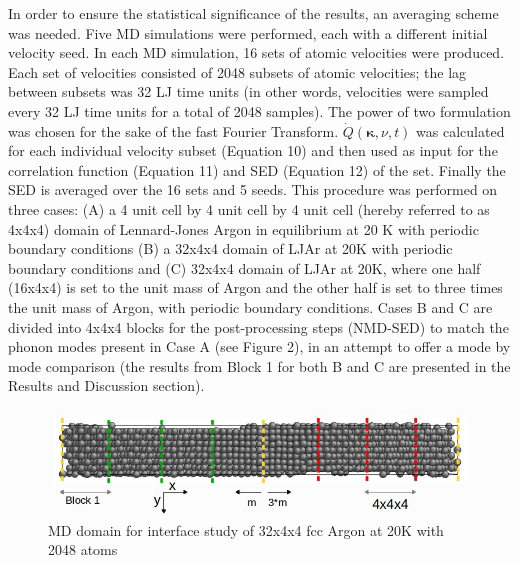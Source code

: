 \documentclass{article}
\begin{document}
In order to ensure the statistical significance of the results, an averaging scheme was needed. Five MD simulations were performed, each with a different initial velocity seed. In each MD simulation, 16 sets of atomic velocities were produced. Each set of velocities consisted of 2048 subsets of atomic velocities; the lag between subsets was 32 LJ time units (in other words, velocities were sampled every 32 LJ time units for a total of 2048 samples). The power of two formulation was chosen for the sake of the fast Fourier Transform. $\dot{Q}(\pmb{\kappa},\nu,t)$ was calculated for each individual velocity subset (Equation 10) and then used as input for the correlation function (Equation 11) and SED (Equation 12) of the set. Finally the SED is averaged over the 16 sets and 5 seeds. This procedure was performed on three cases: (A) a 4 unit cell by 4 unit cell by 4 unit cell (hereby referred to as 4x4x4) domain of Lennard-Jones Argon in equilibrium at 20 K with periodic boundary conditions (B) a 32x4x4 domain of LJAr at 20K with periodic boundary conditions and (C) 32x4x4 domain of LJAr at 20K, where one half (16x4x4) is set to the unit mass of Argon and the other half is set to three times the unit mass of Argon, with periodic boundary conditions. Cases B and C are divided into 4x4x4 blocks for the post-processing steps (NMD-SED) to match the phonon modes present in Case A (see Figure 2), in an attempt to offer a mode by mode comparison (the results from Block 1 for both B and C are presented in the Results and Discussion section). 

\begin{figure}[ht]
\centering
\includegraphics[scale=0.5]{mddom1.jpg}
\caption{MD domain for interface study of 32x4x4 fcc Argon at 20K with 2048 atoms}
\label{fig:subfig1}
\end{figure}
\end{document}
